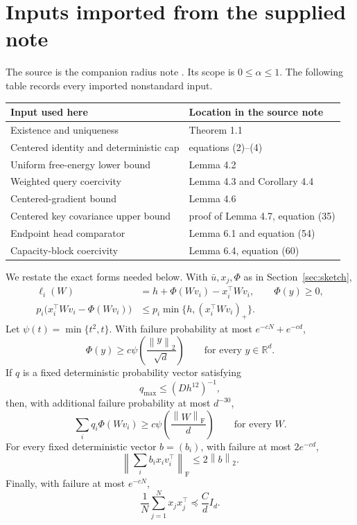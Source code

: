 \documentclass[11pt]{article}
\theoremstyle{remark}
\newcommand{\R}{\mathbb R}
\newcommand{\norm}[1]{\left\lVert #1\right\rVert}
\newcommand{\Frob}{\mathrm F}
\begin{document}
\section{Inputs imported from the supplied note}
\label{sec:imports}

The source is the companion radius note \cite{radius-note}.  Its scope
is \(0\leq\alpha\leq1\).  The following table records every imported
nonstandard input.
\begin{center}
\begin{tabular}{ll}
\toprule
Input used here & Location in the source note\\
\midrule
Existence and uniqueness & Theorem 1.1\\
Centered identity and deterministic cap & equations (2)--(4)\\
Uniform free-energy lower bound & Lemma 4.2\\
Weighted query coercivity & Lemma 4.3 and Corollary 4.4\\
Centered-gradient bound & Lemma 4.6\\
Centered key covariance upper bound & proof of Lemma 4.7, equation (35)\\
Endpoint head comparator & Lemma 6.1 and equation (54)\\
Capacity-block coercivity & Lemma 6.4, equation (60)\\
\bottomrule
\end{tabular}
\end{center}

We restate the exact forms needed below.  With \(\bar u,x_j,\Phi\)
as in Section~\ref{sec:sketch},
\begin{align}
 \ell_i(W)&=h+\Phi(Wv_i)-x_i^\top Wv_i,
 \qquad \Phi(y)\geq0,
 \label{eq:centered}\\
 p_i\bigl(x_i^\top Wv_i-\Phi(Wv_i)\bigr)
 &\leq p_i\min\{h,(x_i^\top Wv_i)_+\}.
 \label{eq:cap}
\end{align}
Let \(\psi(t)=\min\{t^2,t\}\).  With failure probability at most
\(e^{-cN}+e^{-cd}\),
\begin{equation}
 \Phi(y)\geq c\psi\!\left(\frac{\norm y_2}{\sqrt d}\right)
 \qquad\text{for every }y\in\R^d.
 \label{eq:pointwise-free}
\end{equation}
If \(q\) is a fixed deterministic probability vector satisfying
\[
 q_{\max}\leq(Dh^{12})^{-1},
\]
then, with additional failure probability at most \(d^{-30}\),
\begin{equation}
 \sum_iq_i\Phi(Wv_i)
 \geq c\psi\!\left(\frac{\norm W_{\Frob}}d\right)
 \qquad\text{for every }W.
 \label{eq:query-coercivity}
\end{equation}
For every fixed deterministic vector \(b=(b_i)\), with failure at
most \(2e^{-cd}\),
\begin{equation}
 \left\|\sum_i b_ix_iv_i^\top\right\|_{\Frob}
 \leq2\norm b_2.
 \label{eq:centered-gradient}
\end{equation}
Finally, with failure at most \(e^{-cN}\),
\begin{equation}
 \frac1N\sum_{j=1}^Nx_jx_j^\top\preceq\frac{C}{d}I_d.
 \label{eq:key-covariance}
\end{equation}
\end{document}
